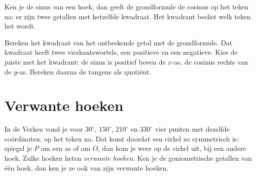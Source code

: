 Ken je de sinus van een hoek, dan geeft de grondformule de cosinus op het teken na: er zijn twee getallen met hetzelfde kwadraat. Het kwadrant beslist welk teken het wordt.


\begin{werkwijze}
Bereken het kwadraat van het ontbrekende getal met de grondformule. Dat kwadraat heeft twee vierkantswortels, een positieve en een negatieve. Kies de juiste met het kwadrant: de sinus is positief boven de $x$-as, de cosinus rechts van de $y$-as. Bereken daarna de tangens als quotiënt.
\end{werkwijze}


\begin{oefeningen}
\end{oefeningen}

\section{Verwante hoeken}

In de Verken vond je voor $30^\circ$, $150^\circ$, $210^\circ$ en $330^\circ$ vier punten met dezelfde coördinaten, op het teken na. Dat komt doordat een cirkel zo symmetrisch is: spiegel je $P$ om een as of om $O$, dan kom je weer op de cirkel uit, bij een andere hoek. Zulke hoeken heten \emph{verwante hoeken}. Ken je de goniometrische getallen van één hoek, dan ken je ze ook van zijn verwante hoeken.


